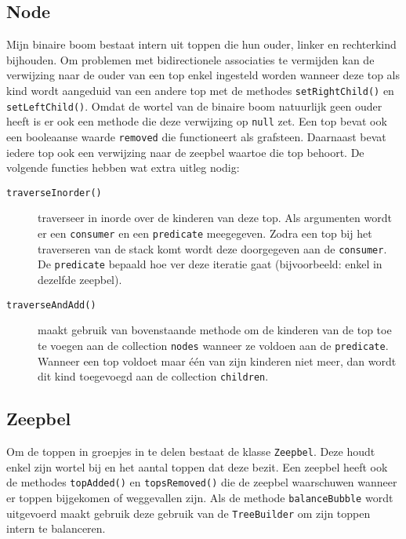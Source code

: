 \documentclass[12pt,hidelinks]{article}
\begin{document}
    \subsection{Node}
    Mijn binaire boom bestaat intern uit toppen die hun ouder,  linker en
    rechterkind bijhouden. Om problemen met bidirectionele associaties te vermijden kan de verwijzing
    naar de ouder van een top enkel ingesteld worden wanneer deze top als kind wordt
    aangeduid van een andere top met de methodes {\tt setRightChild()} en {\tt setLeftChild()}. Omdat de wortel van de binaire boom natuurlijk geen
    ouder heeft is er ook een methode die deze verwijzing op {\tt null} zet.
    Een top bevat ook een booleaanse waarde {\tt removed} die functioneert als
    grafsteen. Daarnaast bevat iedere top ook een verwijzing naar de zeepbel waartoe die 
    top behoort. De volgende functies hebben wat extra uitleg nodig:\\
        \begin{description}
            \item[\tt traverseInorder()] traverseer in inorde over de kinderen van deze top. Als argumenten wordt er een {\tt consumer} en een {\tt predicate} meegegeven.
                Zodra een top bij het traverseren van de stack komt wordt deze doorgegeven aan de {\tt consumer}. De {\tt predicate} bepaald hoe ver deze iteratie gaat
                (bijvoorbeeld: enkel in dezelfde zeepbel).
            \item[\tt traverseAndAdd()] maakt gebruik van bovenstaande methode om de kinderen van de top toe te voegen aan de collection {\tt nodes} wanneer ze voldoen aan de
                {\tt predicate}. Wanneer een top voldoet maar één van zijn kinderen niet meer, dan wordt dit kind toegevoegd aan de collection {\tt children}.
        \end{description}
    \subsection{Zeepbel}
    Om de toppen in groepjes in te delen bestaat de klasse {\tt Zeepbel}. Deze houdt
    enkel zijn wortel bij en het aantal toppen dat deze bezit. Een zeepbel heeft ook de
    methodes {\tt topAdded()} en {\tt topsRemoved()} die de zeepbel waarschuwen wanneer
    er toppen bijgekomen of weggevallen zijn. Als de methode {\tt balanceBubble} wordt uitgevoerd
    maakt gebruik deze gebruik van de {\tt TreeBuilder} om zijn toppen intern te balanceren.
\end{document}
